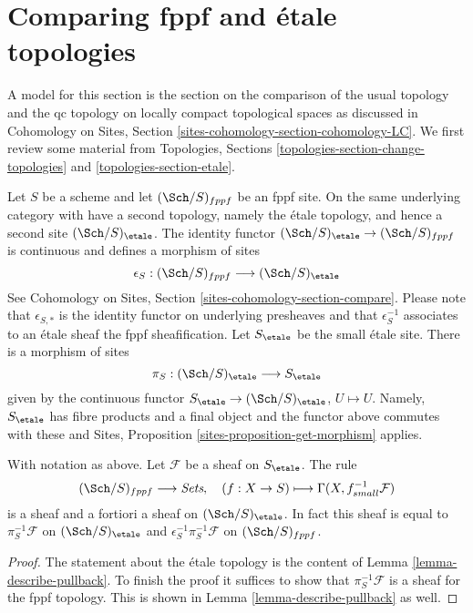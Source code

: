 \section{Comparing fppf and \'etale topologies}
\label{section-fppf-etale}

\noindent
A model for this section is the section on the comparison of the
usual topology and the qc topology on locally compact topological
spaces as discussed in Cohomology on Sites, Section
\ref{sites-cohomology-section-cohomology-LC}.
We first review some material from
Topologies, Sections
\ref{topologies-section-change-topologies} and
\ref{topologies-section-etale}.

\medskip\noindent
Let $S$ be a scheme and let $(\Sch/S)_{fppf}$ be an fppf site.
On the same underlying category with have a second topology,
namely the \'etale topology, and hence a second site
$(\Sch/S)_\etale$. The identity functor
$(\Sch/S)_\etale \to (\Sch/S)_{fppf}$ is continuous and defines
a morphism of sites
$$
\epsilon_S : (\Sch/S)_{fppf} \longrightarrow (\Sch/S)_\etale
$$
See Cohomology on Sites, Section \ref{sites-cohomology-section-compare}.
Please note that $\epsilon_{S, *}$ is the identity functor on underlying
presheaves and that $\epsilon_S^{-1}$ associates to an \'etale sheaf the
fppf sheafification. Let $S_\etale$ be the small \'etale site.
There is a morphism of sites
$$
\pi_S : (\Sch/S)_\etale \longrightarrow S_\etale
$$
given by the continuous functor
$S_\etale \to (\Sch/S)_\etale$, $U \mapsto U$.
Namely, $S_\etale$ has fibre products and a final object and the
functor above commutes with these and
Sites, Proposition \ref{sites-proposition-get-morphism} applies.

\begin{lemma}
\label{lemma-describe-pullback-pi-fppf}
With notation as above.
Let $\mathcal{F}$ be a sheaf on $S_\etale$. The rule
$$
(\Sch/S)_{fppf} \longrightarrow \textit{Sets},\quad
(f : X \to S) \longmapsto \Gamma(X, f_{small}^{-1}\mathcal{F})
$$
is a sheaf and a fortiori a sheaf on $(\Sch/S)_\etale$.
In fact this sheaf is equal to
$\pi_S^{-1}\mathcal{F}$ on $(\Sch/S)_\etale$ and
$\epsilon_S^{-1}\pi_S^{-1}\mathcal{F}$ on $(\Sch/S)_{fppf}$.
\end{lemma}

\begin{proof}
The statement about the \'etale topology is the content
of Lemma \ref{lemma-describe-pullback}. To finish the proof it
suffices to show that $\pi_S^{-1}\mathcal{F}$ is a sheaf for the fppf
topology. This is shown in Lemma \ref{lemma-describe-pullback}
as well.
\end{proof}

